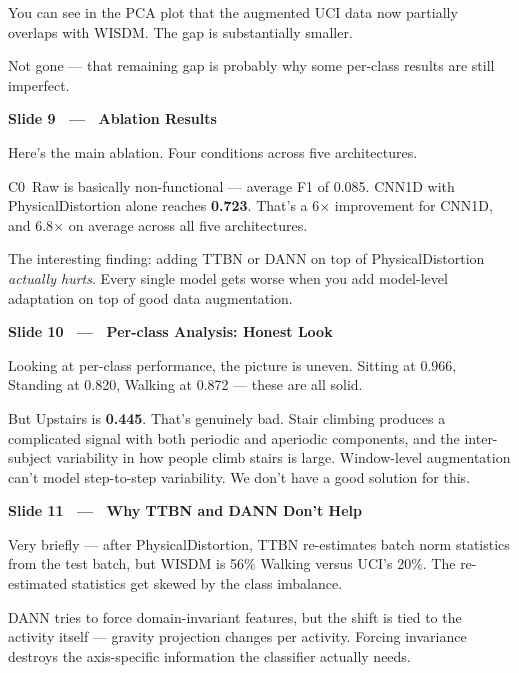 \documentclass[12pt]{article}
\newcommand{\slidetitle}[1]{%
  \vspace{14pt}%
  \noindent\colorbox{pennblue}{\parbox{\dimexpr\textwidth-2\fboxsep\relax}{%
    \strut\bfseries\color{white}\quad #1\strut}}%
  \vspace{4pt}\par
}
\newcommand{\timing}[1]{%
  \noindent{\small\bfseries\color{pennred}#1}\quad\par\vspace{2pt}%
}
\begin{document}
You can see in the PCA plot that the augmented UCI data now partially overlaps
with WISDM. The gap is substantially smaller.

Not gone --- that remaining gap is probably why some per-class results are
still imperfect.

\slidetitle{Slide 9 \ — \ Ablation Results}
\timing{[5:00 – 5:30]}

Here's the main ablation. Four conditions across five architectures.

C0~Raw is basically non-functional --- average F1 of 0.085. CNN1D with
PhysicalDistortion alone reaches \textbf{0.723}. That's a 6$\times$ improvement
for CNN1D, and 6.8$\times$ on average across all five architectures.

The interesting finding: adding TTBN or DANN on top of PhysicalDistortion
\emph{actually hurts}. Every single model gets worse when you add model-level
adaptation on top of good data augmentation.

\slidetitle{Slide 10 \ — \ Per-class Analysis: Honest Look}
\timing{[5:30 – 6:00]}

Looking at per-class performance, the picture is uneven. Sitting at 0.966,
Standing at 0.820, Walking at 0.872 --- these are all solid.

But Upstairs is \textbf{0.445}. That's genuinely bad. Stair climbing produces
a complicated signal with both periodic and aperiodic components, and the
inter-subject variability in how people climb stairs is large.
Window-level augmentation can't model step-to-step variability.
We don't have a good solution for this.

\slidetitle{Slide 11 \ — \ Why TTBN and DANN Don't Help}
\timing{[6:00 – 6:20]}

Very briefly --- after PhysicalDistortion, TTBN re-estimates batch norm
statistics from the test batch, but WISDM is 56\% Walking versus UCI's 20\%.
The re-estimated statistics get skewed by the class imbalance.

DANN tries to force domain-invariant features, but the shift is tied to the
activity itself --- gravity projection changes per activity. Forcing invariance
destroys the axis-specific information the classifier actually needs.
\end{document}
